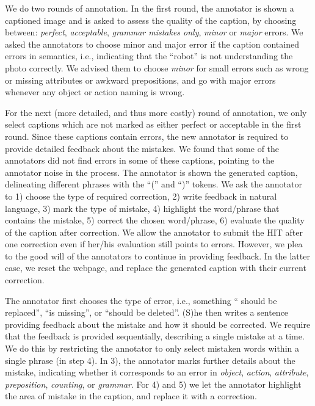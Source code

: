 We do two rounds of annotation. In the first round, the annotator is shown a captioned image and is asked to assess the quality of the caption, by choosing between: \emph{perfect}, \emph{acceptable}, \emph{grammar mistakes only}, \emph{minor} or \emph{major} errors. We asked the annotators to choose minor and major error if the caption contained errors in semantics, i.e., indicating that the ``robot'' is not understanding the photo correctly. We advised them to choose \emph{minor} for small errors such as wrong or missing attributes or awkward prepositions, and go with major errors whenever any object or action naming is wrong. %



For the next (more detailed, and thus more costly) round of annotation, we only select captions which are not marked as either perfect or acceptable in the first round. Since these captions contain errors, the new annotator is required to provide detailed feedback about the mistakes. We found that some of the annotators did not find errors  in some of these captions, pointing to the annotator noise in the process. 
The annotator is shown the generated caption, delineating different phrases with the ``('' and ``)'' tokens. We ask the annotator to 
1) choose the type of required correction, 
2) write feedback in natural language, 
3) mark the type of mistake,
4) highlight the word/phrase that contains the mistake, 
5) correct the chosen word/phrase, 
6) evaluate the quality of the caption after correction. We allow the annotator to submit the HIT after one correction even if her/his evaluation still points to errors. However, we plea to the good will of the annotators to continue in providing feedback. In the latter case, we reset the webpage, and replace the generated caption with their current correction. 
 
The annotator first chooses the type of error, i.e., something `` should be replaced'', ``is missing'', or ``should be deleted''. (S)he then writes a sentence providing feedback about the mistake and how it should be corrected. We require that the feedback is provided sequentially, describing a single mistake at a time. We do this by restricting the annotator to only  select mistaken words within a single phrase (in step 4). In 3), the annotator marks further details about the mistake, indicating whether it corresponds to an error in \emph{object}, \emph{action}, \emph{attribute}, \emph{preposition}, \emph{counting}, or \emph{grammar}. 
For 4) and 5) we let the annotator highlight the area of mistake in the caption, and replace it with a correction.%

